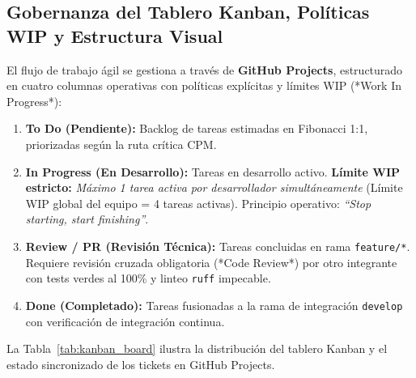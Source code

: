 \documentclass[12pt,letterpaper]{article}
\begin{document}
\subsection{Gobernanza del Tablero Kanban, Políticas WIP y Estructura Visual}
El flujo de trabajo ágil se gestiona a través de \textbf{GitHub Projects}, estructurado en cuatro columnas operativas con políticas explícitas y límites WIP (*Work In Progress*):
\begin{enumerate}[leftmargin=*]
    \item \textbf{To Do (Pendiente):} Backlog de tareas estimadas en Fibonacci 1:1, priorizadas según la ruta crítica CPM.
    \item \textbf{In Progress (En Desarrollo):} Tareas en desarrollo activo. \textbf{Límite WIP estricto:} \textit{Máximo 1 tarea activa por desarrollador simultáneamente} (Límite WIP global del equipo = 4 tareas activas). Principio operativo: \textit{``Stop starting, start finishing''}.
    \item \textbf{Review / PR (Revisión Técnica):} Tareas concluidas en rama \texttt{feature/*}. Requiere revisión cruzada obligatoria (*Code Review*) por otro integrante con tests verdes al 100\% y linteo \texttt{ruff} impecable.
    \item \textbf{Done (Completado):} Tareas fusionadas a la rama de integración \texttt{develop} con verificación de integración continua.
\end{enumerate}

La Tabla~\ref{tab:kanban_board} ilustra la distribución del tablero Kanban y el estado sincronizado de los tickets en GitHub Projects.
\end{document}

